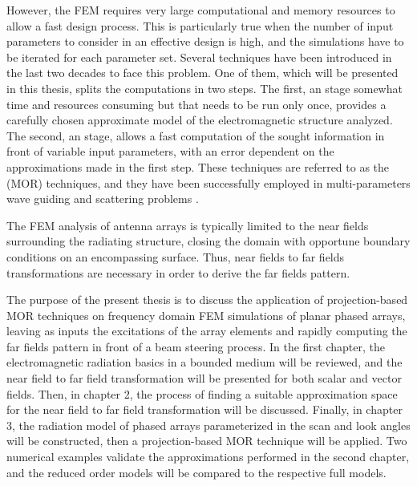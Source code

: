 \par However, the FEM requires very large computational and memory resources to allow a fast design process. This is particularly true when the number of input parameters to consider in an effective design is high, and the simulations have to be iterated for each parameter set. Several techniques have been introduced in the last two decades to face this problem. One of them, which will be presented in this thesis, splits the computations in two steps. The first, an  stage somewhat time and resources consuming but that needs to be run only once, provides a carefully chosen approximate model of the electromagnetic structure analyzed. The second, an  stage, allows a fast computation of the sought information in front of variable input parameters, with an error dependent on the approximations made in the first step. These techniques are referred to as the  (MOR) techniques, and they have been successfully employed in multi-parameters wave guiding and scattering problems \cite{SelleriEdlingerDDMOR,BertazziGhioneMOR, FarleMORFE, LedgerPerairePESSRIWA}.

\par The FEM analysis of antenna arrays is typically limited to the near fields surrounding the radiating structure, closing the domain with opportune boundary conditions on an encompassing surface. Thus, near fields to far fields transformations are necessary in order to derive the far fields pattern.

\par The purpose of the present thesis is to discuss the application of projection-based MOR techniques on frequency domain FEM simulations of planar phased arrays, leaving as inputs the excitations of the array elements and rapidly computing the far fields pattern in front of a beam steering process. In the first chapter, the electromagnetic radiation basics in a bounded medium will be reviewed, and the near field to far field transformation will be presented for both scalar and vector fields. Then, in chapter 2, the process of finding a suitable approximation space for the near field to far field transformation will be discussed. Finally, in chapter 3, the radiation model of phased arrays parameterized in the scan and look angles will be constructed, then a projection-based MOR technique will be applied. Two numerical examples validate the approximations performed in the second chapter, and the reduced order models will be compared to the respective full models.

\pagestyle{headings}
\renewcommand\thefigure{\thechapter.\arabic{figure}}
